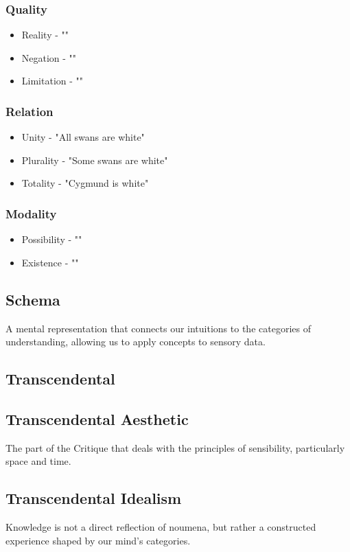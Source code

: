\documentclass[a4paper]{article}
\begin{document}
\subsubsection{Quality}
\begin{itemize}
    \item Reality - ""
    \item Negation - ""
    \item Limitation - ""
\end{itemize}

\subsubsection{Relation}
\begin{itemize}
    \item Unity - "All swans are white"
    \item Plurality - "Some swans are white"
    \item Totality - "Cygmund is white"
\end{itemize}

\subsubsection{Modality}
\begin{itemize}
    \item Possibility - ""
    \item Existence - ""
\end{itemize}


\subsection{Schema}
A mental representation that connects our intuitions to the categories of understanding, allowing us to apply concepts to sensory data.

\subsection{Transcendental}

\subsection{Transcendental Aesthetic}
The part of the Critique that deals with the principles of sensibility, particularly space and time.

\subsection{Transcendental Idealism}
Knowledge is not a direct reflection of noumena, but rather a constructed experience shaped by our mind's categories.
\end{document}
